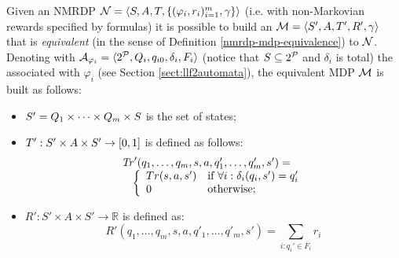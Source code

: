 \begin{definition}\label{nmrdp-mdp-transformation-brafman}
	Given an NMRDP $\mathcal{N} = \langle S, A, T, \{(\varphi_i, r_i)^m_{i=1}, \gamma\} \rangle$ (i.e. with non-Markovian rewards specified by \LLf formulas) it is possible to build an  $\mathcal{M} = \langle S', A, T', R', \gamma \rangle$ that is \emph{equivalent} (in the sense of Definition \ref{nmrdp-mdp-equivalence}) to $\mathcal{N}$. Denoting with 
	$\mathcal{A}_{\varphi_i} = \langle 2^{\mathcal{P}}, Q_i, q_{i0}, \delta_i,F_i \rangle$ (notice that $S\subseteq 2^{\mathcal{P}}$ and $\delta_i$ is total) the \DFA associated 
	with $\varphi_i$ (see Section \ref{sect:llf2automata}), the equivalent MDP $\mathcal{M}$ is built as follows:
	\begin{itemize}
		\itemsep=0mm
		\item $S'=Q_1\times\cdots\times Q_m\times S$ is the set of states;
		\item $T' : S'\times A \times S'\rightarrow [0,1]$ is defined as follows:
		\[
		\begin{array}{l}
		\mathit{Tr}'(q_1,\ldots,q_m, s, a, q'_1,\ldots,q'_m, s') = {}\\
		\quad\left\{
		\begin{array}{ll}
			Tr(s,a,s') &\mbox{if } \forall i:\delta_i(q_i,s') = q'_i\\
			0 & \mbox{otherwise}; 
			\end{array}\right.
		\end{array}
		\] 
		\item $R': S'\times A \times S'\rightarrow 
		\mathbb{R}$ is defined as:
		\[
		R'(q_1,\ldots,q_m, s, a, q'_1,\ldots,q'_m, s') = 
		\sum_{i: q_i'\in F_i} r_i
		\] 
	\end{itemize}
\end{definition}


